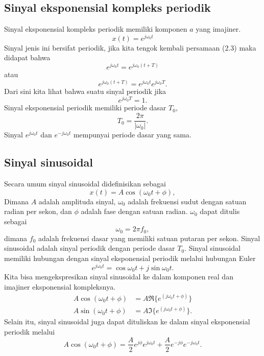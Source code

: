\subsection{Sinyal eksponensial kompleks periodik}
Sinyal eksponensial kompleks periodik memiliki komponen $a$ yang imajiner. 
\begin{equation}
x(t)=e^{j\omega_0 t}
\end{equation}
Sinyal jenis ini bersifat periodik, jika kita tengok kembali persamaan (2.3) maka didapat bahwa
\[
e^{j\omega_0 t}=e^{j\omega_0 (t+T)}
\]
atau
\[
e^{j\omega_0(t+T)}=e^{j\omega_0 t} e^{j\omega_0 T}.
\]
Dari sini kita lihat bahwa suatu sinyal periodik jika 
\[
e^{j\omega_0 T} = 1.
\]
Sinyal eksponensial periodik memiliki periode dasar $T_0$,
\begin{equation}
T_0=\frac{2\pi}{|\omega_0|}.
\end{equation}
Sinyal $e^{j\omega_0 t}$ dan $e^{-j\omega_0 t}$ mempunyai periode dasar yang sama.

\subsection{Sinyal sinusoidal}
Secara umum sinyal sinusoidal didefinisikan sebagai
\begin{equation}
x(t) = A \cos (\omega_0 t + \phi),
\end{equation}
Dimana $A$ adalah amplituda sinyal, $\omega_0$ adalah frekuensi sudut dengan satuan radian per sekon, dan $\phi$ adalah fase dengan satuan radian. $\omega_0$ dapat ditulis sebagai
\[
\omega_0=2 \pi f_0,
\]
dimana $f_0$ adalah frekuensi dasar yang memiliki satuan putaran per sekon. Sinyal sinusoidal adalah sinyal periodik dengan periode dasar $T_0$. Sinyal sinusoidal memiliki hubungan dengan sinyal eksponensial periodik melalui hubungan Euler
\begin{equation}
e^{j\omega_0 t}=\cos \omega_0 t + j \sin \omega_0 t.
\end{equation}
Kita bisa mengekspresikan sinyal sinusoidal ke dalam komponen real dan imajiner eksponensial kompleksnya.
\begin{align}
A\cos (\omega_0 t+\phi)&=A \Re\lbrace e^{(j\omega_0t+\phi)}\rbrace\\
A\sin (\omega_0 t +\phi)&= A\Im\lbrace e^{(j\omega_0 t+\phi)}\rbrace. 
\end{align}
Selain itu, sinyal sinusoidal juga dapat dituliskan ke dalam sinyal eksponensial periodik melalui
\begin{equation}
A\cos (\omega_0 t+\phi)=\frac{A}{2}e^{j\phi}e^{j\omega_0 t} + \frac{A}{2} e^{-j \phi} e^{-j\omega_0 t}. 
\end{equation} 

